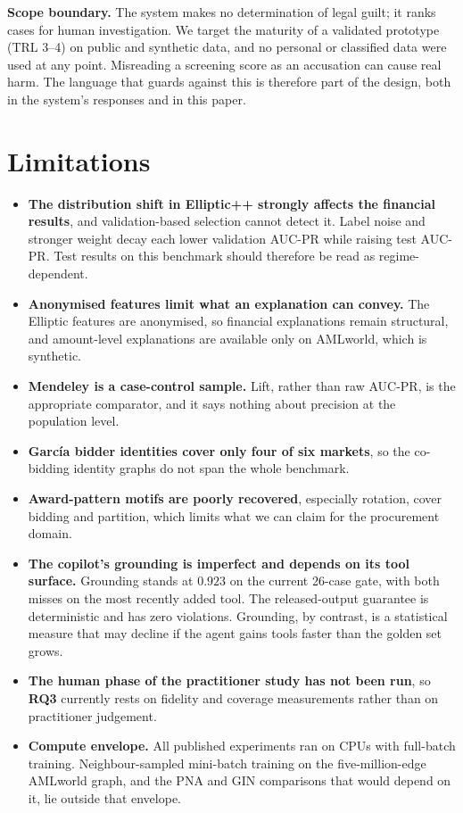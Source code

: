 \documentclass[conference]{IEEEtran}
\newcommand{\RQ}[1]{\textbf{RQ#1}}
\begin{document}
\textbf{Scope boundary.} The system makes no determination of legal guilt; it
ranks cases for human investigation. We target the maturity of a validated
prototype (TRL 3--4) on public and synthetic data, and no personal or classified
data were used at any point. Misreading a screening score as an accusation can
cause real harm. The language that guards against this is therefore part of the
design, both in the system's responses and in this paper.

\section{Limitations}

\begin{itemize}
\item \textbf{The distribution shift in Elliptic++ strongly affects the
financial results}, and validation-based selection cannot detect it. Label noise
and stronger weight decay each lower validation AUC-PR while raising test
AUC-PR. Test results on this benchmark should therefore be read as
regime-dependent.
\item \textbf{Anonymised features limit what an explanation can convey.} The
Elliptic features are anonymised, so financial explanations remain structural,
and amount-level explanations are available only on AMLworld, which is
synthetic.
\item \textbf{Mendeley is a case-control sample.} Lift, rather than raw
AUC-PR, is the appropriate comparator, and it says nothing about precision at
the population level.
\item \textbf{Garc\'ia bidder identities cover only four of six markets}, so the
co-bidding identity graphs do not span the whole benchmark.
\item \textbf{Award-pattern motifs are poorly recovered}, especially rotation,
cover bidding and partition, which limits what we can claim for the procurement
domain.
\item \textbf{The copilot's grounding is imperfect and depends on its tool
surface.} Grounding stands at $0.923$ on the current 26-case gate, with both
misses on the most recently added tool. The released-output guarantee is
deterministic and has zero violations. Grounding, by contrast, is a statistical
measure that may decline if the agent gains tools faster than the golden set
grows.
\item \textbf{The human phase of the practitioner study has not been run}, so
\RQ{3} currently rests on fidelity and coverage measurements rather than on
practitioner judgement.
\item \textbf{Compute envelope.} All published experiments ran on CPUs with
full-batch training. Neighbour-sampled mini-batch training on the
five-million-edge AMLworld graph, and the PNA and GIN comparisons that would
depend on it, lie outside that envelope.
\end{itemize}
\end{document}
